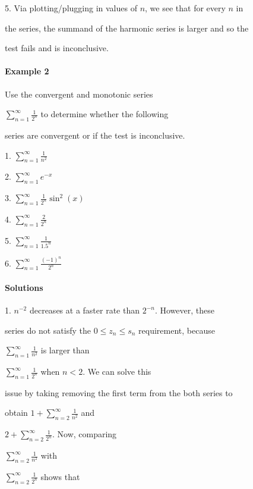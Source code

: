 5.  Via plotting/plugging in values of $n$, we see that for every $n$ in

    the series, the summand of the harmonic series is larger and so the

    test fails and is inconclusive.



\paragraph{Example 2}



Use the convergent and monotonic series

$\sum _{n=1}^{\infty}{\frac{1}{2^n}}$ to determine whether the following

series are convergent or if the test is inconclusive.



1.  $\sum _{n=1}^{\infty}{\frac{1}{n^2}}$

2.  $\sum _{n=1}^{\infty}{e^{-x}}$

3.  $\sum _{n=1}^{\infty}{\frac{1}{2^n} \sin^2(x)}$

4.  $\sum _{n=1}^{\infty}{\frac{2}{2^n}}$

5.  $\sum _{n=1}^{\infty}{\frac{1}{1.5^n}}$

6.  $\sum _{n=1}^{\infty}{\frac{(-1)^n}{2^n}}$



\paragraph{Solutions}



1.  $n^{-2}$ decreases at a faster rate than $2^{-n}$. However, these

    series do not satisfy the $0 \leq z _n \leq s _n$ requirement, because

    $\sum _{n=1}^{\infty}{\frac{1}{n^2}}$ is larger than

    $\sum _{n=1}^{\infty}{\frac{1}{2^n}}$ when $n < 2$. We can solve this

    issue by taking removing the first term from the both series to

    obtain $1 + \sum _{n=2}^{\infty}{\frac{1}{n^2}}$ and

    $2 + \sum _{n=2}^{\infty}{\frac{1}{2^n}}$. Now, comparing

    $\sum _{n=2}^{\infty}{\frac{1}{n^2}}$ with

    $\sum _{n=2}^{\infty}{\frac{1}{2^n}}$ shows that

